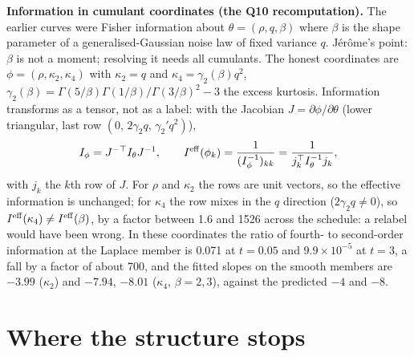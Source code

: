 \textbf{Information in cumulant coordinates (the Q10 recomputation).} The earlier curves were Fisher information about $\theta=(\rho,q,\beta)$ where $\beta$ is the shape parameter of a generalised-Gaussian noise law of fixed variance $q$. Jérôme's point: $\beta$ is not a moment; resolving it needs all cumulants. The honest coordinates are $\phi=(\rho,\kappa_2,\kappa_4)$ with
$\kappa_2=q$ and $\kappa_4=\gamma_2(\beta)q^2$, $\gamma_2(\beta)=\Gamma(5/\beta)\Gamma(1/\beta)/\Gamma(3/\beta)^2-3$ the excess kurtosis. Information transforms as a tensor, not as a label: with the Jacobian $J=\partial\phi/\partial\theta$ (lower triangular, last row $(0,\,2\gamma_2q,\,\gamma_2'q^2)$),
\begin{equation}
I_\phi=J^{-\top}I_\theta J^{-1},\qquad I^{\rm eff}(\phi_k)=\frac1{(I_\phi^{-1})_{kk}}=\frac1{j_k^{\top}I_\theta^{-1}j_k},
\end{equation}
with $j_k$ the $k$th row of $J$. For $\rho$ and $\kappa_2$ the rows are unit vectors, so the effective information is unchanged; for $\kappa_4$ the row mixes in the $q$ direction ($2\gamma_2q\neq0$), so $I^{\rm eff}(\kappa_4)\ne I^{\rm eff}(\beta)$, by a factor between 1.6 and 1526 across the schedule: a relabel would have been wrong. In these coordinates the ratio of fourth- to second-order information at the Laplace member
is 0.071 at $t=0.05$ and $9.9\times10^{-5}$ at $t=3$, a fall by a factor of about 700, and the fitted slopes on the smooth members are $-3.99$ ($\kappa_2$) and $-7.94$, $-8.01$ ($\kappa_4$, $\beta=2,3$), against the predicted $-4$ and $-8$.

\section{Where the structure stops}

